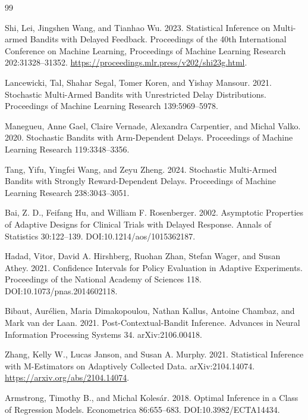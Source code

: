 \documentclass{article}
\begin{document}
\begin{thebibliography}{99}

   Shi, Lei, Jingshen Wang, and Tianhao Wu. 2023. Statistical Inference on Multi-armed Bandits with Delayed Feedback. Proceedings of the 40th International Conference on Machine Learning, Proceedings of Machine Learning Research 202:31328--31352. \url{https://proceedings.mlr.press/v202/shi23g.html}.

   Lancewicki, Tal, Shahar Segal, Tomer Koren, and Yishay Mansour. 2021. Stochastic Multi-Armed Bandits with Unrestricted Delay Distributions. Proceedings of Machine Learning Research 139:5969--5978.

   Manegueu, Anne Gael, Claire Vernade, Alexandra Carpentier, and Michal Valko. 2020. Stochastic Bandits with Arm-Dependent Delays. Proceedings of Machine Learning Research 119:3348--3356.

   Tang, Yifu, Yingfei Wang, and Zeyu Zheng. 2024. Stochastic Multi-Armed Bandits with Strongly Reward-Dependent Delays. Proceedings of Machine Learning Research 238:3043--3051.

   Bai, Z. D., Feifang Hu, and William F. Rosenberger. 2002. Asymptotic Properties of Adaptive Designs for Clinical Trials with Delayed Response. Annals of Statistics 30:122--139. DOI:10.1214/aos/1015362187.

   Hadad, Vitor, David A. Hirshberg, Ruohan Zhan, Stefan Wager, and Susan Athey. 2021. Confidence Intervals for Policy Evaluation in Adaptive Experiments. Proceedings of the National Academy of Sciences 118. DOI:10.1073/pnas.2014602118.

   Bibaut, Aurélien, Maria Dimakopoulou, Nathan Kallus, Antoine Chambaz, and Mark van der Laan. 2021. Post-Contextual-Bandit Inference. Advances in Neural Information Processing Systems 34. arXiv:2106.00418.

   Zhang, Kelly W., Lucas Janson, and Susan A. Murphy. 2021. Statistical Inference with M-Estimators on Adaptively Collected Data. arXiv:2104.14074. \url{https://arxiv.org/abs/2104.14074}.

   Armstrong, Timothy B., and Michal Kolesár. 2018. Optimal Inference in a Class of Regression Models. Econometrica 86:655--683. DOI:10.3982/ECTA14434.


\end{thebibliography}
\end{document}
